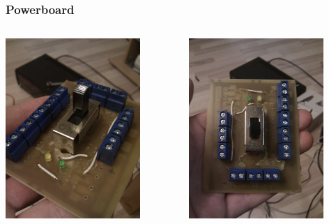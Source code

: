 \documentclass[pdf]{beamer}
\begin{document}
\begin{frame}
  \frametitle{Powerboard}
  \begin{columns}
  \begin{center}
  \includegraphics[width = 0.8\textwidth]{pics/raw/powerboard_1.jpg}
  \end{center}
  \begin{center}
  \includegraphics[width = 0.8\textwidth]{pics/raw/powerboard_2.jpg}
  \end{center}
  \end{columns}
\end{frame}
\end{document}
